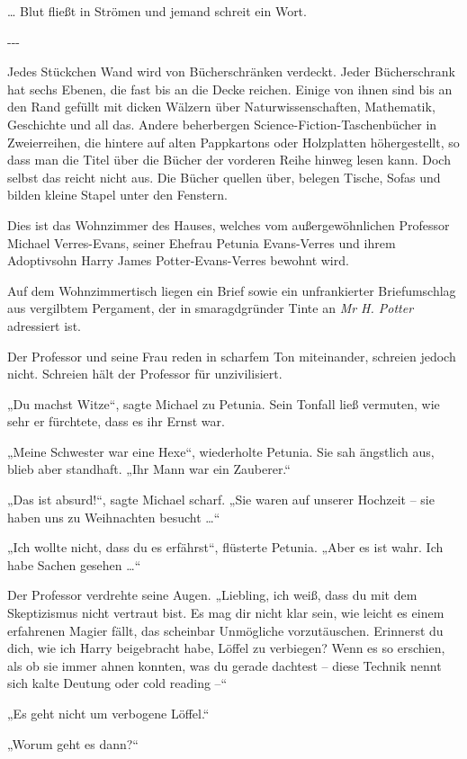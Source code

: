 {{… Blut fließt in Strömen und jemand schreit ein Wort.}

-\/-\/-

Jedes Stückchen Wand wird von Bücherschränken verdeckt. Jeder Bücherschrank hat sechs Ebenen, die fast bis an die Decke reichen. Einige von ihnen sind bis an den Rand gefüllt mit dicken Wälzern über Naturwissenschaften, Mathematik, Geschichte und all das. Andere beherbergen Science-Fiction-Taschenbücher in Zweierreihen, die hintere auf alten Pappkartons oder Holzplatten höhergestellt, so dass man die Titel über die Bücher der vorderen Reihe hinweg lesen kann. Doch selbst das reicht nicht aus. Die Bücher quellen über, belegen Tische, Sofas und bilden kleine Stapel unter den Fenstern.

Dies ist das Wohnzimmer des Hauses, welches vom außergewöhnlichen Professor Michael Verres-Evans, seiner Ehefrau Petunia Evans-Verres und ihrem Adoptivsohn Harry James Potter-Evans-Verres bewohnt wird.

Auf dem Wohnzimmertisch liegen ein Brief sowie ein unfrankierter Briefumschlag aus vergilbtem Pergament, der in smaragdgründer Tinte an \emph{Mr H. Potter} adressiert ist.

Der Professor und seine Frau reden in scharfem Ton miteinander, schreien jedoch nicht. Schreien hält der Professor für unzivilisiert.

„Du machst Witze“, sagte Michael zu Petunia. Sein Tonfall ließ vermuten, wie sehr er fürchtete, dass es ihr Ernst war.

„Meine Schwester war eine Hexe“, wiederholte Petunia. Sie sah ängstlich aus, blieb aber standhaft. „Ihr Mann war ein Zauberer.“

„Das ist absurd!“, sagte Michael scharf. „Sie waren auf unserer Hochzeit -- sie haben uns zu Weihnachten besucht …“

„Ich wollte nicht, dass du es erfährst“, flüsterte Petunia. „Aber es ist wahr. Ich habe Sachen gesehen …“

Der Professor verdrehte seine Augen. „Liebling, ich weiß, dass du mit dem Skeptizismus nicht vertraut bist. Es mag dir nicht klar sein, wie leicht es einem erfahrenen Magier fällt, das scheinbar Unmögliche vorzutäuschen. Erinnerst du dich, wie ich Harry beigebracht habe, Löffel zu verbiegen? Wenn es so erschien, als ob sie immer ahnen konnten, was du gerade dachtest -- diese Technik nennt sich kalte Deutung oder cold reading --“

„Es geht nicht um verbogene Löffel.“

„Worum geht es dann?“

}
